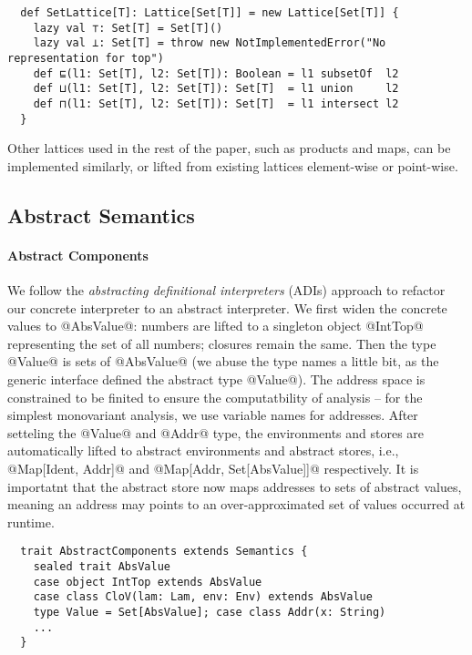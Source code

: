 \begin{lstlisting}
  def SetLattice[T]: Lattice[Set[T]] = new Lattice[Set[T]] {
    lazy val ⊤: Set[T] = Set[T]()
    lazy val ⊥: Set[T] = throw new NotImplementedError("No representation for top")
    def ⊑(l1: Set[T], l2: Set[T]): Boolean = l1 subsetOf  l2
    def ⊔(l1: Set[T], l2: Set[T]): Set[T]  = l1 union     l2
    def ⊓(l1: Set[T], l2: Set[T]): Set[T]  = l1 intersect l2
  }
\end{lstlisting}

Other lattices used in the rest of the paper, such as products and maps, can be
implemented similarly, or lifted from existing lattices element-wise or point-wise.

\subsection{Abstract Semantics}

\paragraph{Abstract Components}


We follow the \textit{abstracting definitional interpreters} (ADIs) approach
\cite{DBLP:journals/pacmpl/DaraisLNH17} to refactor our concrete interpreter to
an abstract interpreter. We first widen the concrete values to @AbsValue@: numbers
are lifted to a singleton object @IntTop@ representing the set of all numbers;
closures remain the same. Then the type @Value@ is sets of @AbsValue@ (we abuse
the type names a little bit, as the generic interface defined the abstract type
@Value@).
The address space is constrained to be finited to ensure the computatbility of
analysis -- for the simplest monovariant analysis, we use variable names for
addresses. After setteling the @Value@ and @Addr@ type, the environments and
stores are automatically lifted to abstract environments and abstract stores,
i.e., @Map[Ident, Addr]@ and @Map[Addr, Set[AbsValue]]@ respectively.
It is importatnt that the abstract store now maps addresses to sets of abstract
values, meaning an address may points to an over-approximated set of values
occurred at runtime.

\begin{lstlisting}
  trait AbstractComponents extends Semantics {
    sealed trait AbsValue
    case object IntTop extends AbsValue
    case class CloV(lam: Lam, env: Env) extends AbsValue
    type Value = Set[AbsValue]; case class Addr(x: String)
    ...
  }
\end{lstlisting}

